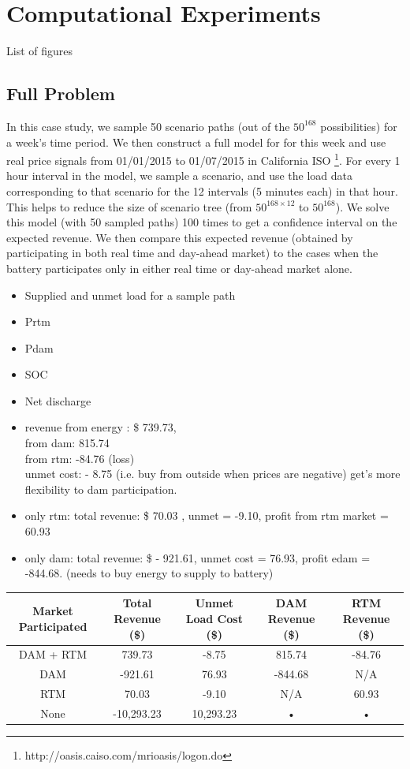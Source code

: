 \documentclass[11pt,twoside]{article}
\begin{document}
\section{Computational Experiments}\label{sec:exp}
List of figures

\subsection{Full Problem}
In this case study, we sample 50 scenario paths (out of the $50^{168}$ possibilities) for a week's time period. We then construct a full model for for this week and use real price signals from 01/01/2015 to 01/07/2015 in California ISO \footnote{http://oasis.caiso.com/mrioasis/logon.do}. For every 1 hour interval in the model, we sample a scenario, and use the load data corresponding to that scenario for the 12 intervals (5 minutes each) in that hour. This helps to reduce the size of scenario tree (from $50^{168 \times 12}$ to $50^{168}$). We solve this model (with 50 sampled paths) 100 times to get a confidence interval on the expected revenue. We then compare this expected revenue (obtained by participating in both real time and day-ahead market) to the cases when the battery participates only in either real time or day-ahead market alone.
\begin{itemize}
\item Supplied and unmet load for a sample path
\item Prtm
\item Pdam
\item SOC 
\item Net discharge
\item revenue from energy : \$ 739.73, \\ from dam: 815.74 \\ from rtm:  -84.76 (loss) \\unmet cost: - 8.75   (i.e. buy from outside when prices are negative)
get's more flexibility to dam participation. 
\item only rtm: total revenue: \$ 70.03 , unmet = -9.10, profit from rtm market =  60.93
\item only dam: total revenue: \$ - 921.61, unmet cost = 76.93, profit edam = -844.68. (needs to buy energy to supply to battery) 
\end{itemize}
\begin{tabular}{|c|c|c|c|c|}
\hline 
Market Participated  & Total Revenue (\$) & Unmet Load Cost (\$) & DAM Revenue  (\$) & RTM Revenue (\$) \\ 
\hline 
DAM + RTM & 739.73 & -8.75 & 815.74 & -84.76 \\ 
\hline 
DAM & -921.61 & 76.93 & -844.68 & N/A \\ 
\hline 
RTM & 70.03 & -9.10 & N/A & 60.93 \\ 
\hline 
None & -10,293.23 & 10,293.23 & • & • \\ 
\hline 
\end{tabular} 
\end{document}
